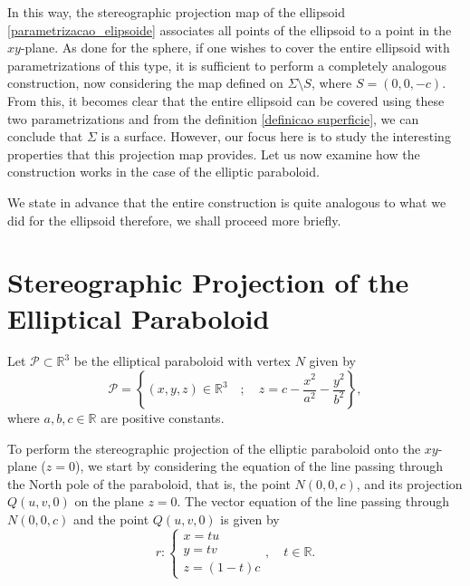 \documentclass{amsart}
\theoremstyle{plain}
\numberwithin{equation}{section}
\begin{document}
In this way, the stereographic projection map of the ellipsoid \eqref{parametrizacao_elipsoide} associates all points of the ellipsoid to a point in the \( xy \)-plane. As done for the sphere, if one wishes to cover the entire ellipsoid with parametrizations of this type, it is sufficient to perform a completely analogous construction, now considering the map defined on $ \Sigma \setminus S$, where \( S = (0, 0, -c) \). From this, it becomes clear that the entire ellipsoid can be covered using these two parametrizations and from the definition \ref{definicao superficie}, we can conclude that $\Sigma$ is a surface. However, our focus here is to study the interesting properties that this projection map provides. Let us now examine how the construction works in the case of the elliptic paraboloid. 

We state in advance that the entire construction is quite analogous to what we did for the ellipsoid therefore, we shall proceed more briefly.


\section{Stereographic Projection of the Elliptical Paraboloid}\label{secao paraboloide}

Let \( \mathcal{P} \subset \mathbb{R}^3 \) be the elliptical paraboloid with vertex $N$ given by
\begin{equation} \label{paraboloide}
	\mathcal{P} = \left\{ (x,y,z) \in \mathbb{R}^3 \quad ; \quad z = c - \dfrac{x^2}{a^2} - \dfrac{y^2}{b^2}  \right\},  
\end{equation}
where \( a,b,c \in \mathbb{R} \) are positive constants.

To perform the stereographic projection of the elliptic paraboloid onto the \( xy \)-plane (\( z = 0 \)), we start by considering the equation of the line passing through the North pole of the paraboloid, that is, the point \( N(0,0,c) \), and its projection \( Q(u,v,0) \) on the plane \( z=0 \). The vector equation of the line passing through \( N(0,0,c) \) and the point \( Q(u,v,0) \) is given by
\begin{equation}\label{reta_paraboloide}
	r: 
	\begin{cases}
		x = tu \\
		y = tv \\
		z = (1 - t)c
	\end{cases}, \quad t \in \mathbb{R}.
\end{equation}
\end{document}
